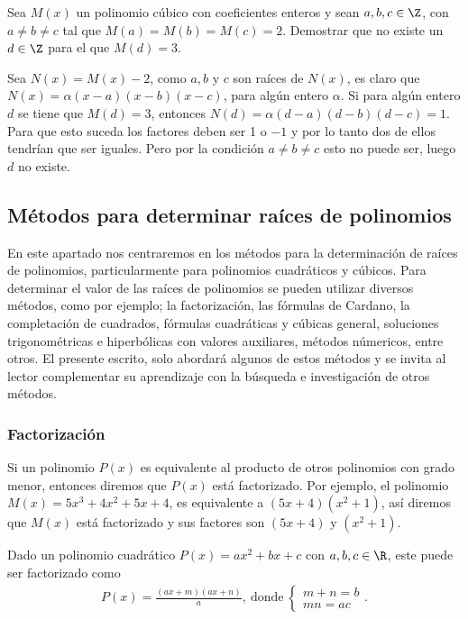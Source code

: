 \begin{section-example.tcb}
    Sea $M(x)$ un polinomio cúbico con coeficientes enteros y sean $a, b, c \in \Z$, con $a \neq b \neq c$ tal que $M(a) = M(b) = M(c) = 2$.
    Demostrar que no existe un $d \in \Z$ para el que $M(d) = 3.$
\end{section-example.tcb}
\begin{solution}
    Sea $N(x) = M(x) - 2$, como $a, b \text{ y } c$ son raíces de $N(x)$, es claro que $N(x) = \alpha (x - a)(x - b)(x - c)$, para algún entero $\alpha$.
    Si para algún entero $d$ se tiene que $M(d) = 3$, entonces $N(d) = \alpha (d - a)(d - b)(d - c) = 1$.
    Para que esto suceda los factores deben ser 1 o $-1$ y por lo tanto dos de ellos tendrían que ser iguales.
    Pero por la condición $a \neq b \neq c$ esto no puede ser, luego $d$ no existe.
\end{solution}



\subsection{Métodos para determinar raíces de polinomios}

En este apartado nos centraremos en los métodos para la determinación de raíces de polinomios, particularmente para polinomios cuadráticos y cúbicos.
Para determinar el valor de las raíces de polinomios se pueden utilizar diversos métodos, como por ejemplo;
la factorización, las fórmulas de Cardano, la completación de cuadrados, fórmulas cuadráticas y cúbicas general, soluciones trigonométricas e hiperbólicas con valores auxiliares, métodos númericos, entre otros.
El presente escrito, solo abordará algunos de estos métodos y se invita al lector complementar su aprendizaje con la búsqueda e investigación de otros métodos.



\subsubsection{Factorización}\label{factorization-section}

Si un polinomio $P(x)$ es equivalente al producto de otros polinomios con grado menor, entonces diremos que $P(x)$ está factorizado.
Por ejemplo, el polinomio $M(x) = 5x^3 + 4x^2 + 5x + 4$, es equivalente a $(5x+4)(x^2 + 1)$, así diremos que $M(x)$ está factorizado y sus factores son $(5x+4) \mbox{ y } (x^2 + 1)$.

\begin{section-definition.tcb}
    Dado un polinomio cuadrático $P(x) = ax^2 + bx + c$ con $a, b, c \in \R$, este puede ser factorizado como
    \begin{gather*}
        P(x) = \frac{(ax+m)(ax+n)}{a},\ \text{donde} \
        \begin{cases}
            m + n = b\\
            mn = ac
        \end{cases}.
    \end{gather*}
\end{section-definition.tcb}


